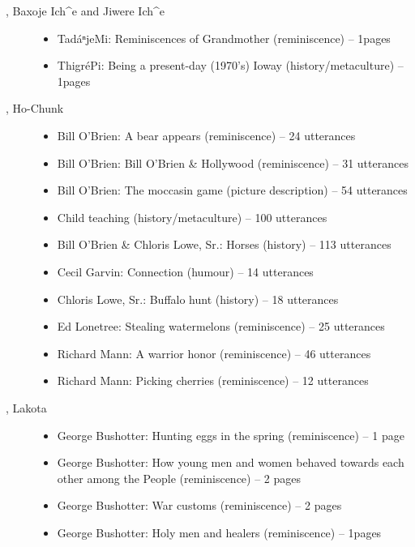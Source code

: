 \documentclass[output=paper]{LSP/langsci}
\begin{document}
\begin{description}
\item[\citet{GoodTracks2004b}, Baxoje Ich\^{}e and Jiwere Ich\^{}e]\hfill
\begin{itemize}
\item TadáⁿjeMi: Reminiscences of Grandmother (reminiscence) -- 1\textonehalf{}pages
\item ThigréPi: Being a present-day (1970’s) Ioway (history/metaculture) -- 1\textonehalf{}pages
\end{itemize}

\item[\citet{HartmannMarschke2010}, Ho-Chunk]\hfill
\begin{itemize}
\item Bill O’Brien: A bear appears (reminiscence) -- 24 utterances
\item Bill O’Brien: Bill O’Brien \& Hollywood (reminiscence) -- 31 utterances
\item Bill O’Brien: The moccasin game (picture description) -- 54 utterances
\item Child teaching (history/metaculture) -- 100 utterances
\item Bill O’Brien \& Chloris Lowe, Sr.: Horses (history) -- 113 utterances
\item Cecil Garvin: Connection (humour) -- 14 utterances
\item Chloris Lowe, Sr.: Buffalo hunt (history) -- 18 utterances
\item Ed Lonetree: Stealing watermelons (reminiscence) -- 25 utterances
\item Richard Mann: A warrior honor (reminiscence) -- 46 utterances
\item Richard Mann: Picking cherries (reminiscence) -- 12 utterances
\end{itemize}

\item[\citet{Ingham2003}, Lakota]\hfill
\begin{itemize}
\item George Bushotter: Hunting eggs in the spring (reminiscence) -- 1 page
\item George Bushotter: How young men and women behaved towards each other among the People (reminiscence) -- 2 pages
\item George Bushotter: War customs (reminiscence) -- 2 pages
\item George Bushotter: Holy men and healers (reminiscence) -- 1\textonehalf{}pages
\end{itemize}


\end{description}
\end{document}
